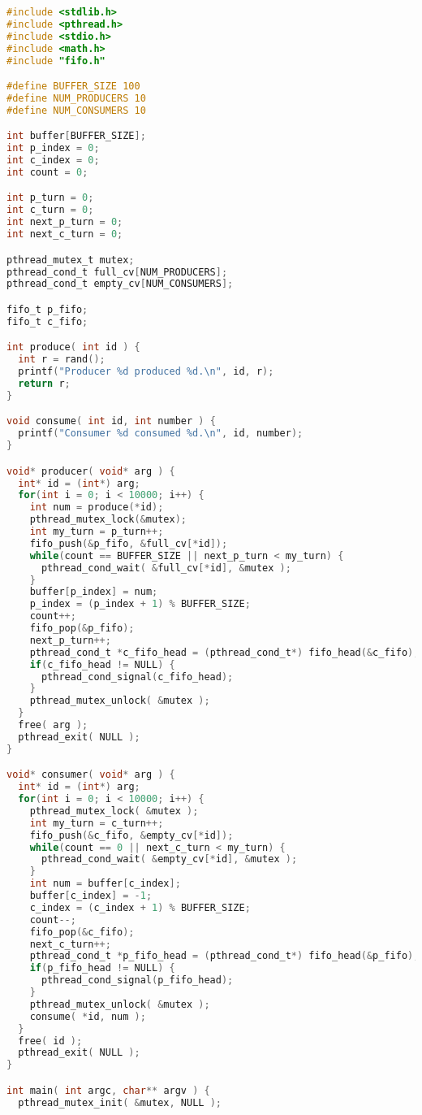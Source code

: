 \begin{lstlisting}[language=C]
#include <stdlib.h>
#include <pthread.h>
#include <stdio.h>
#include <math.h>
#include "fifo.h"

#define BUFFER_SIZE 100
#define NUM_PRODUCERS 10
#define NUM_CONSUMERS 10

int buffer[BUFFER_SIZE];
int p_index = 0;
int c_index = 0;
int count = 0;

int p_turn = 0;
int c_turn = 0;
int next_p_turn = 0;
int next_c_turn = 0;

pthread_mutex_t mutex;
pthread_cond_t full_cv[NUM_PRODUCERS];
pthread_cond_t empty_cv[NUM_CONSUMERS];

fifo_t p_fifo;
fifo_t c_fifo;

int produce( int id ) {
  int r = rand();
  printf("Producer %d produced %d.\n", id, r);
  return r;
}

void consume( int id, int number ) {
  printf("Consumer %d consumed %d.\n", id, number);
}

void* producer( void* arg ) {
  int* id = (int*) arg;
  for(int i = 0; i < 10000; i++) {
    int num = produce(*id);
    pthread_mutex_lock(&mutex);
    int my_turn = p_turn++;
    fifo_push(&p_fifo, &full_cv[*id]);
    while(count == BUFFER_SIZE || next_p_turn < my_turn) {
      pthread_cond_wait( &full_cv[*id], &mutex );
    }
    buffer[p_index] = num;
    p_index = (p_index + 1) % BUFFER_SIZE;
    count++;
    fifo_pop(&p_fifo);
    next_p_turn++;
    pthread_cond_t *c_fifo_head = (pthread_cond_t*) fifo_head(&c_fifo);
    if(c_fifo_head != NULL) {
      pthread_cond_signal(c_fifo_head);
    }
    pthread_mutex_unlock( &mutex );
  }
  free( arg );
  pthread_exit( NULL );
}

void* consumer( void* arg ) {
  int* id = (int*) arg;
  for(int i = 0; i < 10000; i++) {
    pthread_mutex_lock( &mutex );
    int my_turn = c_turn++;
    fifo_push(&c_fifo, &empty_cv[*id]);
    while(count == 0 || next_c_turn < my_turn) {
      pthread_cond_wait( &empty_cv[*id], &mutex );
    }
    int num = buffer[c_index];
    buffer[c_index] = -1;
    c_index = (c_index + 1) % BUFFER_SIZE;
    count--;
    fifo_pop(&c_fifo);
    next_c_turn++;
    pthread_cond_t *p_fifo_head = (pthread_cond_t*) fifo_head(&p_fifo);
    if(p_fifo_head != NULL) {
      pthread_cond_signal(p_fifo_head);
    }
    pthread_mutex_unlock( &mutex );
    consume( *id, num );
  }
  free( id );
  pthread_exit( NULL );
}

int main( int argc, char** argv ) {
  pthread_mutex_init( &mutex, NULL );


\end{lstlisting}
